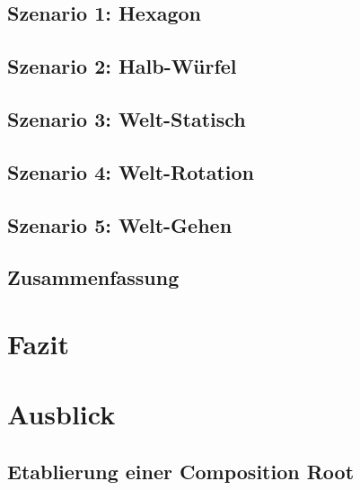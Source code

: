 \documentclass[12pt,a4paper,listof=toc,parskip=half,numbers=noenddot,abstract=true]{scrartcl}
\begin{document}
\subsection{Szenario 1: Hexagon}

\subsection{Szenario 2: Halb-Würfel}

\subsection{Szenario 3: Welt-Statisch}

\subsection{Szenario 4: Welt-Rotation}

\subsection{Szenario 5: Welt-Gehen}

\subsection{Zusammenfassung}


\pagebreak
\section{Fazit}\label{kap:Fazit}

\pagebreak
\section{Ausblick}\label{kap:ausblick}
\subsection{Etablierung einer Composition Root}\label{sec:EtablierungEinerKompositionroot}

\end{document}
